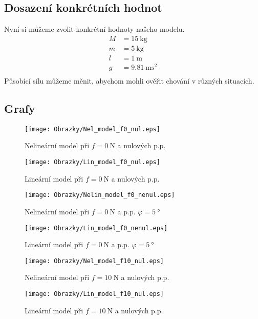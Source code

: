 \documentclass[a4paper, 12pt]{article}
\begin{document}
		\subsection{Dosazení konkrétních hodnot}
			Nyní si můžeme zvolit konkrétní hodnoty našeho modelu. 
			\begin{align*}
				M &= \SI{15}{\kilo\gram}\\
				m &= \SI{5}{\kilo\gram}\\
				l &= \SI{1}{\meter}\\
				g &= \SI{9,81}{\meter\square\second}\\
			\end{align*}
			Působící sílu můžeme měnit, abychom mohli ověřit chování v různých situacích.
		\clearpage
		\subsection{Grafy}
			\begin{figure}[h]
				\begin{center}
					\texttt{[image: Obrazky/Nel\_model\_f0\_nul.eps]}
					\label{Nel_model_f0_nul}
					\caption{Nelineární model při $f=\SI{0}{\newton}$ a nulových p.p.}
				\end{center}
				\begin{center}
					\texttt{[image: Obrazky/Lin\_model\_f0\_nul.eps]}
					\label{Lin_model_f0_nul}
					\caption{Lineární model při $f=\SI{0}{\newton}$ a nulových p.p.}
				\end{center}
			\end{figure}
			\begin{figure}[h]
				\begin{center}
					\texttt{[image: Obrazky/Nelin\_model\_f0\_nenul.eps]}
					\label{Nel_model_f0_nenul}
					\caption{Nelineární model při $f=\SI{0}{\newton}$ a p.p. $\varphi = \SI{5}{\degree}$}
				\end{center}
				\begin{center}
					\texttt{[image: Obrazky/Lin\_model\_f0\_nenul.eps]}
					\label{Lin_model_f0_nenul}
					\caption{Lineární model při $f=\SI{0}{\newton}$ a p.p. $\varphi = \SI{5}{\degree}$}
				\end{center}
			\end{figure}
			\begin{figure}[h]
				\begin{center}
					\texttt{[image: Obrazky/Nel\_model\_f10\_nul.eps]}
					\label{Nel_model_f10_nul}
					\caption{Nelineární model při $f=\SI{10}{\newton}$ a nulových p.p.}
				\end{center}
				\begin{center}
					\texttt{[image: Obrazky/Lin\_model\_f10\_nul.eps]}
					\label{Lin_model_f10_nul}
					\caption{Lineární model při $f=\SI{10}{\newton}$ a nulových p.p.}
				\end{center}
			\end{figure}
\end{document}
